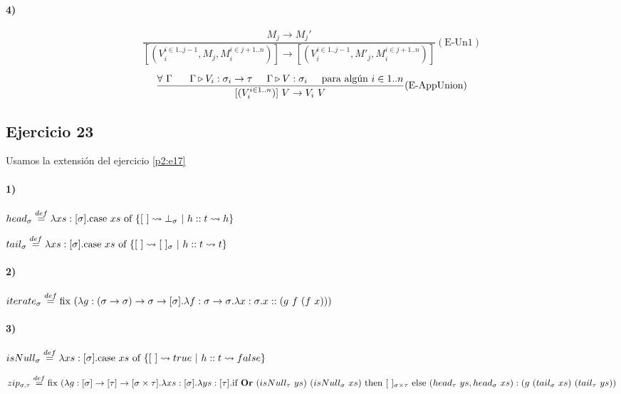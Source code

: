 \documentclass[10pt,a4paper, landscape]{article}
\begin{document}
\paragraph{4)}
\begin{multicols}{2}
$$\frac{M_j\to M_j'}{[(V_i^{i\in 1..j-1}, M_j, M_i^{i\in j+1..n})]\to[(V_i^{i\in 1..j-1}, M'_j, M_i^{i\in j+1..n})]}(\text{E-Un1})$$

$$\frac{\forall~\Gamma~\hspace*{5mm}\Gamma\triangleright V_i : \sigma_i\to\tau\hspace*{5mm}\Gamma\triangleright V : \sigma_i\hspace*{5mm}\text{para algún }i\in 1..n}{[(V_i^{i\in 1..n})]~V\to V_i~V}(\text{E-AppUnion})$$
\end{multicols}

\subsection{Ejercicio 23}
Usamos la extensión del ejercicio \ref{p2:e17}

\paragraph{1)}
\begin{multicols}{2}
$head_\sigma \overset{def}{=} \lambda xs: [\sigma] \text{.} \text{case } xs \text{ of } \{[~]\leadsto\bot_\sigma~|~h::t\leadsto h\}$ 

$tail_\sigma \overset{def}{=} \lambda xs: [\sigma] \text{.} \text{case } xs \text{ of } \{[~]\leadsto[~]_{\sigma}~|~h::t\leadsto t\}$
\end{multicols}

\paragraph{2)}
$iterate_\sigma\overset{def}{=} \text{fix } (\lambda g: (\sigma\to\sigma)\to\sigma\to[\sigma] \text{.} \lambda f: \sigma\to\sigma \text{.} \lambda x: \sigma \text{.} x::(g~f~(f~x)))$

\paragraph{3)} 

$isNull_\sigma \overset{def}{=} \lambda xs: [\sigma] \text{.} \text{case } xs \text{ of } \{[~]\leadsto true~|~h::t\leadsto false\}$

\vspace*{5mm}
$zip_{\sigma,\tau}\overset{def}{=} \text{fix } (\lambda g: [\sigma]\to[\tau]\to[\sigma\times\tau] \text{.} \lambda xs: [\sigma] \text{.} \lambda ys: [\tau] \text{.} \text{if } \textbf{Or}~(isNull_\tau~ys)~(isNull_\sigma~xs) \text{ then } [~]_{\sigma\times\tau} \text{ else } (head_\tau~ys,head_\sigma~xs):(g~(tail_\sigma~xs)~(tail_\tau~ys))$
\end{document}
